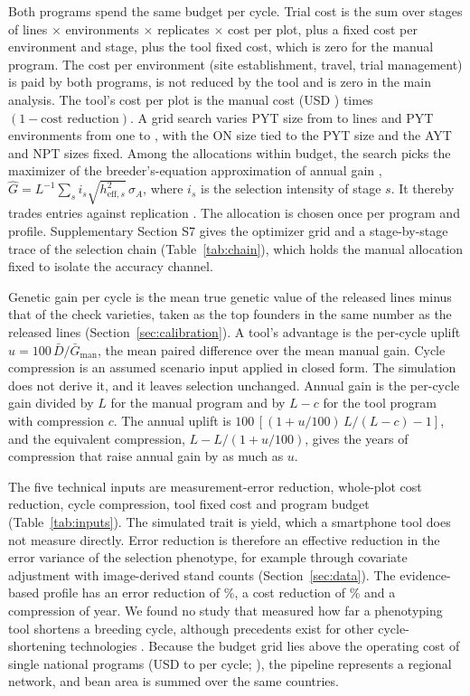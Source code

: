 Both programs spend the same budget per cycle. Trial cost is the sum over stages of lines $\times$ environments $\times$ replicates $\times$ cost per plot, plus a fixed cost per environment and stage, plus the tool fixed cost, which is zero for the manual program. The cost per environment (site establishment, travel, trial management) is paid by both programs, is not reduced by the tool and is zero in the main analysis. The tool's cost per plot is the manual cost (USD \NumCfgCostPerPlot) times $(1-\text{cost reduction})$. A grid search varies PYT size from \NumCfgPYTmin{} to \NumCfgPYTmax{} lines and PYT environments from one to \NumCfgPYTenvMax, with the ON size tied to the PYT size and the AYT and NPT sizes fixed. Among the allocations within budget, the search picks the maximizer of the breeder's-equation approximation of annual gain \citep{Cobb2019Enhancing}, $\hat{G} = L^{-1}\sum_{s} i_s \sqrt{h^2_{\mathrm{eff},s}}\,\sigma_A$, where $i_s$ is the selection intensity of stage $s$. It thereby trades entries against replication \citep{Lorenz2013Resource}. The allocation is chosen once per program and profile. Supplementary Section S7 gives the optimizer grid and a stage-by-stage trace of the selection chain (Table~\ref{tab:chain}), which holds the manual allocation fixed to isolate the accuracy channel.

Genetic gain per cycle is the mean true genetic value of the released lines minus that of the check varieties, taken as the top founders in the same number as the released lines (Section~\ref{sec:calibration}). A tool's advantage is the per-cycle uplift $u = 100\,\bar{D}/\bar{G}_{\mathrm{man}}$, the mean paired difference over the mean manual gain. Cycle compression is an assumed scenario input applied in closed form. The simulation does not derive it, and it leaves selection unchanged. Annual gain is the per-cycle gain divided by $L$ for the manual program and by $L-c$ for the tool program with compression $c$. The annual uplift is $100\,[(1+u/100)\,L/(L-c) - 1]$, and the equivalent compression, $L - L/(1+u/100)$, gives the years of compression that raise annual gain by as much as $u$.

The five technical inputs are measurement-error reduction, whole-plot cost reduction, cycle compression, tool fixed cost and program budget (Table~\ref{tab:inputs}). The simulated trait is yield, which a smartphone tool does not measure directly. Error reduction is therefore an effective reduction in the error variance of the selection phenotype, for example through covariate adjustment with image-derived stand counts (Section~\ref{sec:data}). The evidence-based profile has an error reduction of \NumCfgErrRedCentral\%, a cost reduction of \NumCfgCostRedCentral\% and a compression of \NumCfgCycCompCentral{} year. We found no study that measured how far a phenotyping tool shortens a breeding cycle, although precedents exist for other cycle-shortening technologies \citep{Lin2023Simulations,Chaingeni2025More,Katiyar2026Unified}. Because the budget grid lies above the operating cost of single national programs (USD \NumNatCostMin{} to \NumNatCostMax{} per cycle; \citealp{Das2025Costing,Katiyar2026Unified}), the pipeline represents a regional network, and bean area is summed over the same countries.


